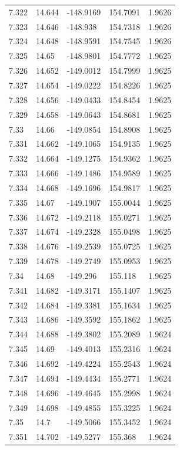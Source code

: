 \begin{tabular}{lllll}
7.322 & 14.644 & -148.9169 & 154.7091 & 1.9626 \\
7.323 & 14.646 & -148.938 & 154.7318 & 1.9626 \\
7.324 & 14.648 & -148.9591 & 154.7545 & 1.9626 \\
7.325 & 14.65 & -148.9801 & 154.7772 & 1.9625 \\
7.326 & 14.652 & -149.0012 & 154.7999 & 1.9625 \\
7.327 & 14.654 & -149.0222 & 154.8226 & 1.9625 \\
7.328 & 14.656 & -149.0433 & 154.8454 & 1.9625 \\
7.329 & 14.658 & -149.0643 & 154.8681 & 1.9625 \\
7.33 & 14.66 & -149.0854 & 154.8908 & 1.9625 \\
7.331 & 14.662 & -149.1065 & 154.9135 & 1.9625 \\
7.332 & 14.664 & -149.1275 & 154.9362 & 1.9625 \\
7.333 & 14.666 & -149.1486 & 154.9589 & 1.9625 \\
7.334 & 14.668 & -149.1696 & 154.9817 & 1.9625 \\
7.335 & 14.67 & -149.1907 & 155.0044 & 1.9625 \\
7.336 & 14.672 & -149.2118 & 155.0271 & 1.9625 \\
7.337 & 14.674 & -149.2328 & 155.0498 & 1.9625 \\
7.338 & 14.676 & -149.2539 & 155.0725 & 1.9625 \\
7.339 & 14.678 & -149.2749 & 155.0953 & 1.9625 \\
7.34 & 14.68 & -149.296 & 155.118 & 1.9625 \\
7.341 & 14.682 & -149.3171 & 155.1407 & 1.9625 \\
7.342 & 14.684 & -149.3381 & 155.1634 & 1.9625 \\
7.343 & 14.686 & -149.3592 & 155.1862 & 1.9625 \\
7.344 & 14.688 & -149.3802 & 155.2089 & 1.9624 \\
7.345 & 14.69 & -149.4013 & 155.2316 & 1.9624 \\
7.346 & 14.692 & -149.4224 & 155.2543 & 1.9624 \\
7.347 & 14.694 & -149.4434 & 155.2771 & 1.9624 \\
7.348 & 14.696 & -149.4645 & 155.2998 & 1.9624 \\
7.349 & 14.698 & -149.4855 & 155.3225 & 1.9624 \\
7.35 & 14.7 & -149.5066 & 155.3452 & 1.9624 \\
7.351 & 14.702 & -149.5277 & 155.368 & 1.9624 \\

\end{tabular}
